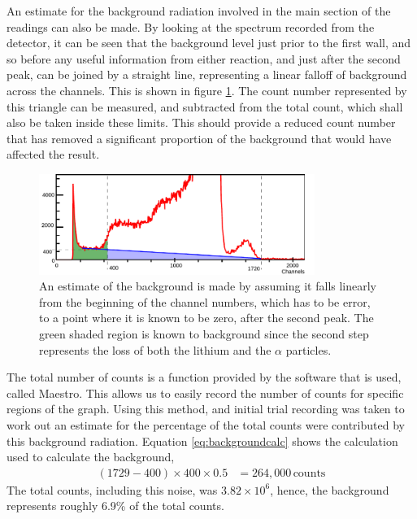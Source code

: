 An estimate for the background radiation involved in the main section of the readings can also be made. By looking at the spectrum recorded from the detector, it can be seen that the background level just prior to the first wall, and so before any useful information from either reaction, and just after the second peak, can be joined by a straight line, representing a linear falloff of background across the channels. This is shown in figure \ref{fig:bf3errorest}. The count number represented by this triangle can be measured, and subtracted from the total count, which shall also be taken inside these limits. This should provide a reduced count number that has removed a significant proportion of the background that would have affected the result.
\begin{figure}[ht]
  \centering
  \includegraphics[width=0.8\textwidth]{BF3background.pdf}
  \caption{An estimate of the background is made by assuming it falls linearly from the beginning of the channel numbers, which has to be error, to a point where it is known to be zero, after the second peak. The green shaded region is known to background since the second step represents the loss of both the lithium and the $\alpha$ particles. \label{fig:bf3errorest}}
\end{figure}

The total number of counts is a function provided by the software that is used, called Maestro. This allows us to easily record the number of counts for specific regions of the graph. Using this method, and initial trial recording was taken to work out an estimate for the percentage of the total counts were contributed by this background radiation. Equation \ref{eq:backgroundcalc} shows the calculation used to calculate the background,
\begin{align}
  (1729-400)\times 400 \times 0.5 &= 264,000\,\text{counts} \label{eq:backgroundcalc}
\end{align}
The total counts, including this noise, was $3.82\times10^6$, hence, the background represents roughly 6.9\% of the total counts.

